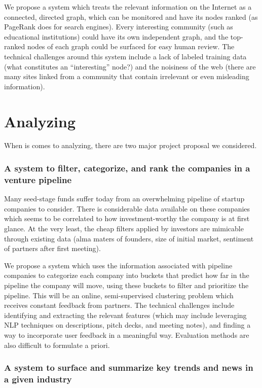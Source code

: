 We propose a system which treats the relevant information on the Internet as a connected, directed graph, which can be monitored and have its nodes ranked (as PageRank does for search engines). Every interesting community (such as educational institutions) could have its own independent graph, and the top-ranked nodes of each graph could be surfaced for easy human review. The technical challenges around this system include a lack of labeled training data (what constitutes an ``interesting'' node?) and the noisiness of the web (there are many sites linked from a community that contain irrelevant or even misleading information).

\section{Analyzing}

When is comes to analyzing, there are two major project proposal we considered.

\subsubsection{A system to filter, categorize, and rank the companies in a venture pipeline}

Many seed-stage funds suffer today from an overwhelming pipeline of startup companies to consider. There is considerable data available on these companies which seems to be correlated to how investment-worthy the company is at first glance. At the very least, the cheap filters applied by investors are mimicable through existing data (alma maters of founders, size of initial market, sentiment of partners after first meeting).

We propose a system which uses the information associated with pipeline companies to categorize each company into buckets that predict how far in the pipeline the company will move, using these buckets to filter and prioritize the pipeline. This will be an online, semi-supervised clustering problem which receives constant feedback from partners. The technical challenges include identifying and extracting the relevant features (which may include leveraging NLP techniques on descriptions, pitch decks, and meeting notes), and finding a way to incorporate user feedback in a meaningful way. Evaluation methods are also difficult to formulate a priori.

\subsubsection{A system to surface and summarize key trends and news in a given industry}

